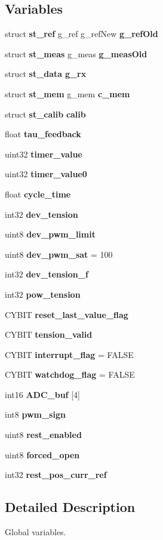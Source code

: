 \subsection*{Variables}
\begin{DoxyCompactItemize}
\item 
struct \textbf{ st\+\_\+ref} g\+\_\+ref g\+\_\+ref\+New \textbf{ g\+\_\+ref\+Old}
\item 
struct \textbf{ st\+\_\+meas} g\+\_\+meas \textbf{ g\+\_\+meas\+Old}
\item 
struct \textbf{ st\+\_\+data} \textbf{ g\+\_\+rx}
\item 
struct \textbf{ st\+\_\+mem} g\+\_\+mem \textbf{ c\+\_\+mem}
\item 
struct \textbf{ st\+\_\+calib} \textbf{ calib}
\item 
float \textbf{ tau\+\_\+feedback}
\item 
uint32 \textbf{ timer\+\_\+value}
\item 
uint32 \textbf{ timer\+\_\+value0}
\item 
float \textbf{ cycle\+\_\+time}
\item 
int32 \textbf{ dev\+\_\+tension}
\item 
uint8 \textbf{ dev\+\_\+pwm\+\_\+limit}
\item 
uint8 \textbf{ dev\+\_\+pwm\+\_\+sat} = 100
\item 
int32 \textbf{ dev\+\_\+tension\+\_\+f}
\item 
int32 \textbf{ pow\+\_\+tension}
\item 
C\+Y\+B\+IT \textbf{ reset\+\_\+last\+\_\+value\+\_\+flag}
\item 
C\+Y\+B\+IT \textbf{ tension\+\_\+valid}
\item 
C\+Y\+B\+IT \textbf{ interrupt\+\_\+flag} = F\+A\+L\+SE
\item 
C\+Y\+B\+IT \textbf{ watchdog\+\_\+flag} = F\+A\+L\+SE
\item 
\mbox{\label{globals_8c_abb22f0a4462a0b4db27496654f2175a0}} 
int16 {\bfseries A\+D\+C\+\_\+buf} [4]
\item 
int8 \textbf{ pwm\+\_\+sign}
\item 
uint8 \textbf{ rest\+\_\+enabled}
\item 
uint8 \textbf{ forced\+\_\+open}
\item 
int32 \textbf{ rest\+\_\+pos\+\_\+curr\+\_\+ref}
\end{DoxyCompactItemize}


\subsection{Detailed Description}
Global variables. 

